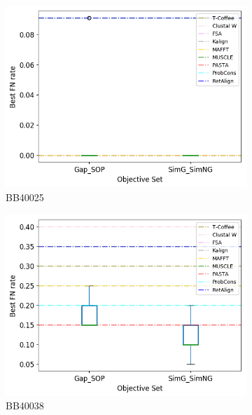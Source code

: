 \begin{figure}[!htbp]
\begin{adjustwidth}{-1cm}{-1cm}
\begin{subfigure}{0.22\textwidth}
			\includegraphics[width=\columnwidth]{Figure/summary/precomputedInit/Balibase/BB40025_objset_fnrate_rank}
			\caption{BB40025}
		\end{subfigure}
		\begin{subfigure}{0.22\textwidth}
			\includegraphics[width=\columnwidth]{Figure/summary/precomputedInit/Balibase/BB40038_objset_fnrate_rank}
			\caption{BB40038}
		\end{subfigure}
		\begin{subfigure}{0.22\textwidth}

\end{subfigure}
\end{adjustwidth}
\end{figure}
